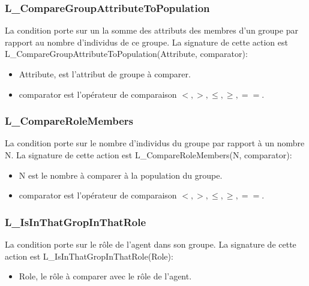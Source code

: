 \subsubsection{L\_CompareGroupAttributeToPopulation}

La condition porte sur un la somme des attributs des membres d'un groupe par rapport au nombre d'individus de ce groupe.
La signature de cette action est L\_CompareGroupAttributeToPopulation(Attribute, comparator):
\begin{itemize}
\item Attribute, est l'attribut de groupe à comparer.
\item comparator est l'opérateur de comparaison $<, >, \leq, \geq, == $.
\end{itemize}


\subsubsection{L\_CompareRoleMembers}

La condition porte sur le nombre d'individus du groupe par rapport à un nombre N.
La signature de cette action est L\_CompareRoleMembers(N, comparator):
\begin{itemize}
\item N est le nombre à comparer à la population du groupe.
\item comparator est l'opérateur de comparaison $<, >, \leq, \geq, == $.
\end{itemize}

\subsubsection{L\_IsInThatGropInThatRole}

La condition porte sur le rôle de l'agent dans son groupe.
La signature de cette action est L\_IsInThatGropInThatRole(Role):
\begin{itemize}
\item Role, le rôle à comparer avec le rôle de l'agent.
\end{itemize}
